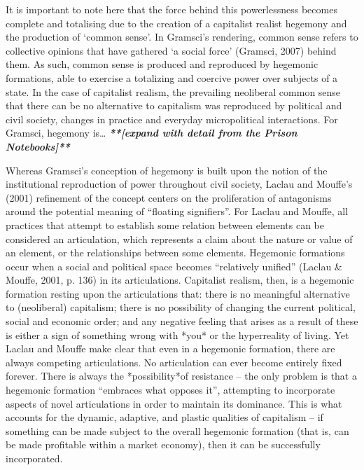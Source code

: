 It is important to note here that the force behind this powerlessness
becomes complete and totalising due to the creation of a capitalist
realist hegemony and the production of `common sense'. In Gramsci's
rendering, common sense refers to collective opinions that have gathered
`a social force' (Gramsci, 2007) behind them. As such, common sense is
produced and reproduced by hegemonic formations, able to exercise a
totalizing and coercive power over subjects of a state. In the case of
capitalist realism, the prevailing neoliberal common sense that there
can be no alternative to capitalism was reproduced by political and
civil society, changes in practice and everyday micropolitical
interactions. For Gramsci, hegemony is\ldots{}
\emph{\textbf{\emph{**{[}expand with detail from the Prison
Notebooks{]}**}}}

Whereas Gramsci's conception of hegemony is built upon the notion of the
institutional reproduction of power throughout civil society, Laclau and
Mouffe's (2001) refinement of the concept centers on the proliferation
of antagonisms around the potential meaning of ``floating signifiers''.
For Laclau and Mouffe, all practices that attempt to establish some
relation between elements can be considered an articulation, which
represents a claim about the nature or value of an element, or the
relationships between some elements. Hegemonic formations occur when a
social and political space becomes ``relatively unified'' (Laclau \&
Mouffe, 2001, p. 136) in its articulations. Capitalist realism, then, is
a hegemonic formation resting upon the articulations that: there is no
meaningful alternative to (neoliberal) capitalism; there is no
possibility of changing the current political, social and economic
order; and any negative feeling that arises as a result of these is
either a sign of something wrong with *you* or the hyperreality of
living. Yet Laclau and Mouffe make clear that even in a hegemonic
formation, there are always competing articulations. No articulation can
ever become entirely fixed forever. There is always the *possibility*of
resistance -- the only problem is that a hegemonic formation ``embraces
what opposes it'', attempting to incorporate aspects of novel
articulations in order to maintain its dominance. This is what accounts
for the dynamic, adaptive, and plastic qualities of capitalism -- if
something can be made subject to the overall hegemonic formation (that
is, can be made profitable within a market economy), then it can be
successfully incorporated.

